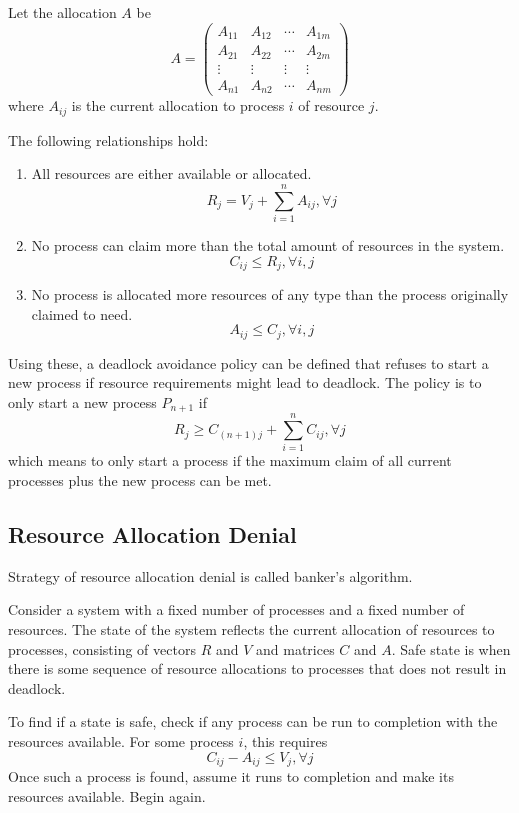 \documentclass[11pt]{article}
\begin{document}
Let the allocation \(A\) be
$$A = \begin{pmatrix}
        A_{11} & A_{12} & \cdots & A_{1m} \\
        A_{21} & A_{22} & \cdots & A_{2m} \\
        \vdots & \vdots & \vdots & \vdots \\
        A_{n1} & A_{n2} & \cdots & A_{nm}
\end{pmatrix}$$
where \(A_{ij}\) is the current allocation to process \(i\) of resource \(j\).

The following relationships hold:
\begin{enumerate}
\item All resources are either available or allocated.
$$R_{j} = V_{j} + \sum_{i = 1}^{n} A_{ij}, \forall j$$
\item No process can claim more than the total amount of resources
in the system.
$$C_{ij} \le R_{j}, \forall i, j$$
\item No process is allocated more resources of any type than the process
originally claimed to need.
$$A_{ij} \le C_{j}, \forall i, j$$
\end{enumerate}

Using these, a deadlock avoidance policy can be defined that refuses to start
a new process if resource requirements might lead to deadlock.
The policy is to only start a new process \(P_{n+1}\) if
$$R_{j} \ge C_{(n+1)j} + \sum_{i = 1}^{n} C_{ij}, \forall j$$
which means to only start a process if the maximum claim of all
current processes plus the new process can be met.
\subsection{Resource Allocation Denial}
\label{sec:org2f8af32}
Strategy of resource allocation denial is called banker's algorithm.

Consider a system with a fixed number of processes and a fixed number of resources.
The state of the system reflects the current allocation of resources to processes,
consisting of vectors \(R\) and \(V\) and matrices \(C\) and \(A\).
Safe state is when there is some sequence of resource allocations to processes
that does not result in deadlock.

To find if a state is safe, check if any process can be run to completion with
the resources available. For some process \(i\), this requires
$$C_{ij} - A_{ij} \le V_{j}, \forall j$$
Once such a process is found, assume it runs to completion and make its resources
available. Begin again.
\end{document}
